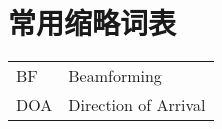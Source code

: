 \chapter{常用缩略词表}
\begin{tabular}{ll}
	BF  & Beamforming          \\
	DOA & Direction of Arrival \\
\end{tabular}
